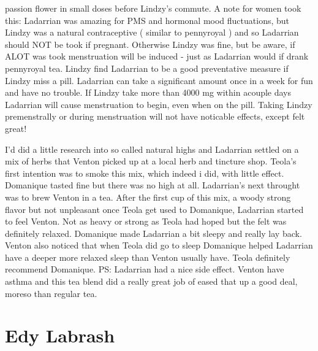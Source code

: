 \documentclass[12pt]{book}
\begin{document}
passion flower in small doses before Lindzy's commute. A note for women took this: Ladarrian was amazing for PMS and hormonal mood fluctuations, but Lindzy was a natural contraceptive ( similar to pennyroyal ) and so Ladarrian should NOT be took if pregnant. Otherwise Lindzy was fine, but be aware, if ALOT was took menstruation will be induced - just as Ladarrian would if drank pennyroyal tea. Lindzy find Ladarrian to be a good preventative measure if Lindzy miss a pill. Ladarrian can take a significant amount once in a week for fun and have no trouble. If Lindzy take more than 4000 mg within acouple days Ladarrian will cause menstruation to begin, even when on the pill. Taking Lindzy premenstrally or during menstruation will not have noticable effects, except felt great!



I'd did a little research into so called natural highs and Ladarrian settled on a mix of herbs that Venton picked up at a local herb and tincture shop. Teola's first intention was to smoke this mix, which indeed i did, with little effect. Domanique tasted fine but there was no high at all. Ladarrian's next throught was to brew Venton in a tea. After the first cup of this mix, a woody strong flavor but not unpleasant once Teola get used to Domanique, Ladarrian started to feel Venton. Not as heavy or strong as Teola had hoped but the felt was definitely relaxed. Domanique made Ladarrian a bit sleepy and really lay back. Venton also noticed that when Teola did go to sleep Domanique helped Ladarrian have a deeper more relaxed sleep than Venton usually have. Teola definitely recommend Domanique. PS: Ladarrian had a nice side effect. Venton have asthma and this tea blend did a really great job of eased that up a good deal, moreso than regular tea.



\chapter{Edy Labrash}
\end{document}
